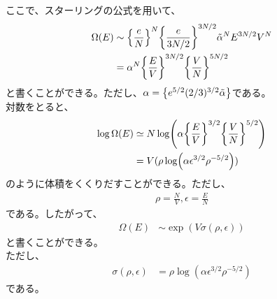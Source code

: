 \documentclass[a4paper,11pt]{jsarticle}
\numberwithin{equation}{section}
\begin{document}
ここで、スターリングの公式を用いて、
\begin{align}
  \Omega(E) &\sim \qty{\frac{e}{N}}^{N} \qty{\frac{e}{3N/2}}^{3N/2} \tilde{\alpha}^N E^{3N/2}V^{N}\\
  &= \alpha^N \qty{\frac{E}{V}}^{3N/2}\qty{\frac{V}{N}}^{5N/2}
\end{align}
と書くことができる。ただし、$\alpha = \qty{e^{5/2}(2/3)^{3/2}\tilde{\alpha}}$である。\\
対数をとると、
\begin{align}
  \log \Omega(E) &\simeq N \log ( \alpha \qty{\frac{E}{V}}^{3/2}\qty{\frac{V}{N}}^{5/2} )\\
  &= V(\rho \log (\alpha \epsilon^{3/2}\rho^{-5/2}))
\end{align}
のように体積をくくりだすことができる。ただし、
\begin{align}
  \rho = \frac{N}{V}, \epsilon = \frac{E}{N}
\end{align}
である。したがって、
\begin{align}
  \Omega (E) &\sim \exp(V\sigma(\rho, \epsilon))
\end{align}
と書くことができる。\\

ただし、
\begin{align}
  \sigma(\rho, \epsilon) &= \rho \log (\alpha \epsilon^{3/2}\rho^{-5/2}) \label{eq:idealsigma}
\end{align}
である。\\
\end{document}
